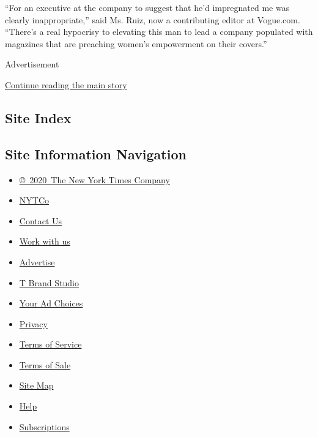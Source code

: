 ``For an executive at the company to suggest that he'd impregnated me
was clearly inappropriate,'' said Ms. Ruiz, now a contributing editor at
Vogue.com. ``There's a real hypocrisy to elevating this man to lead a
company populated with magazines that are preaching women's empowerment
on their covers.''

Advertisement

\protect\hyperlink{after-bottom}{Continue reading the main story}

\hypertarget{site-index}{%
\subsection{Site Index}\label{site-index}}

\hypertarget{site-information-navigation}{%
\subsection{Site Information
Navigation}\label{site-information-navigation}}

\begin{itemize}
\tightlist
\item
  \href{https://help.nytimes3xbfgragh.onion/hc/en-us/articles/115014792127-Copyright-notice}{©~2020~The
  New York Times Company}
\end{itemize}

\begin{itemize}
\tightlist
\item
  \href{https://www.nytco.com/}{NYTCo}
\item
  \href{https://help.nytimes3xbfgragh.onion/hc/en-us/articles/115015385887-Contact-Us}{Contact
  Us}
\item
  \href{https://www.nytco.com/careers/}{Work with us}
\item
  \href{https://nytmediakit.com/}{Advertise}
\item
  \href{http://www.tbrandstudio.com/}{T Brand Studio}
\item
  \href{https://www.nytimes3xbfgragh.onion/privacy/cookie-policy\#how-do-i-manage-trackers}{Your
  Ad Choices}
\item
  \href{https://www.nytimes3xbfgragh.onion/privacy}{Privacy}
\item
  \href{https://help.nytimes3xbfgragh.onion/hc/en-us/articles/115014893428-Terms-of-service}{Terms
  of Service}
\item
  \href{https://help.nytimes3xbfgragh.onion/hc/en-us/articles/115014893968-Terms-of-sale}{Terms
  of Sale}
\item
  \href{https://spiderbites.nytimes3xbfgragh.onion}{Site Map}
\item
  \href{https://help.nytimes3xbfgragh.onion/hc/en-us}{Help}
\item
  \href{https://www.nytimes3xbfgragh.onion/subscription?campaignId=37WXW}{Subscriptions}
\end{itemize}
